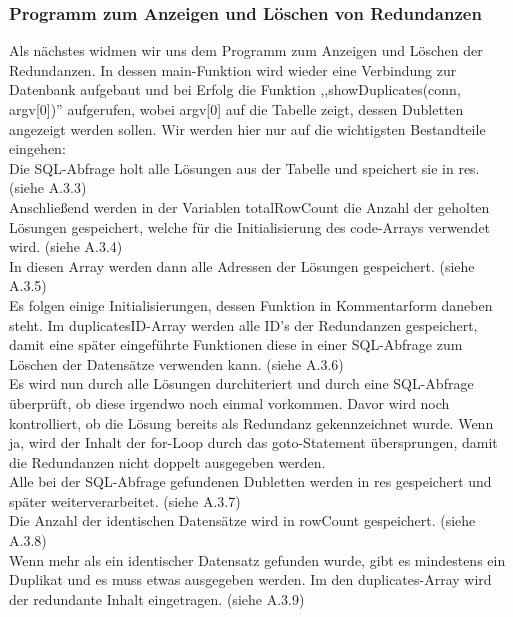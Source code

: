 \documentclass[12pt]{report}
\begin{document}
\subsubsection{Programm zum Anzeigen und Löschen von Redundanzen}
Als nächstes widmen wir uns dem Programm zum Anzeigen und Löschen der Redundanzen. In dessen main-Funktion wird wieder eine Verbindung zur Datenbank aufgebaut und bei Erfolg die Funktion ,,showDuplicates(conn, argv[0])'' aufgerufen, wobei argv[0] auf die Tabelle zeigt, dessen Dubletten angezeigt werden sollen. Wir werden hier nur auf die wichtigsten Bestandteile eingehen:\\

\noindent Die SQL-Abfrage holt alle Lösungen aus der Tabelle und speichert sie in res. (siehe A.3.3)\\

\noindent Anschließend werden in der Variablen totalRowCount die Anzahl der geholten Lösungen gespeichert, welche für die Initialisierung des code-Arrays verwendet wird. (siehe A.3.4)\\

\noindent In diesen Array werden dann alle Adressen der Lösungen gespeichert. (siehe A.3.5)\\

\noindent Es folgen einige Initialisierungen, dessen Funktion in Kommentarform daneben steht. Im duplicatesID-Array werden alle ID's der Redundanzen gespeichert, damit eine später eingeführte Funktionen diese in einer SQL-Abfrage zum Löschen der Datensätze verwenden kann. (siehe A.3.6)\\

\noindent Es wird nun durch alle Lösungen durchiteriert und durch eine SQL-Abfrage überprüft, ob diese irgendwo noch einmal vorkommen. Davor wird noch kontrolliert, ob die Lösung bereits als Redundanz gekennzeichnet wurde. Wenn ja, wird der Inhalt der for-Loop durch das goto-Statement übersprungen, damit die Redundanzen nicht doppelt ausgegeben werden.\\
Alle bei der SQL-Abfrage gefundenen Dubletten werden in res gespeichert und später weiterverarbeitet. (siehe A.3.7)\\

\noindent Die Anzahl der identischen Datensätze wird in rowCount gespeichert. (siehe A.3.8)\\

\noindent Wenn mehr als ein identischer Datensatz gefunden wurde, gibt es mindestens ein Duplikat und es muss etwas ausgegeben werden. Im den duplicates-Array wird der redundante Inhalt eingetragen. (siehe A.3.9)\\
\end{document}
